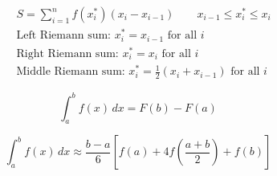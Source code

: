 \[\begin{align} &S = \sum_{i=1}^{n} f(x_i^*)(x_{i} - x_{i-1}) \qquad x_{i-1}\le x_i^* \le x_i \\\ &\text{Left Riemann sum: } x_i^* = x_{i-1} \text{ for all } i \\\ &\text{Right Riemann sum: } x_i^* = x_{i} \text{ for all } i \\\ &\text{Middle Riemann sum: } x_i^* = \frac{1}{2} \left( x_i + x_{i-1} \right) \text{ for all } i \end{align}\]

\[\begin{equation} \int_a^b f(x) \, dx = F(b) - F(a) \end{equation}\]

\[\begin{equation} \int_a^b f(x) \, dx \approx \frac{b-a}{6} \left[ f(a) + 4f \left( \frac{a+b}{2} \right) + f(b) \right] \end{equation}\]
